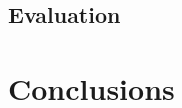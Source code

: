\documentclass[a4paper,fleqn]{cas-sc}
\begin{document}
\subsection{Evaluation}\label{sec:evaluation}
 
 




\section{Conclusions}\label{sec:conclusions}







\end{document}
